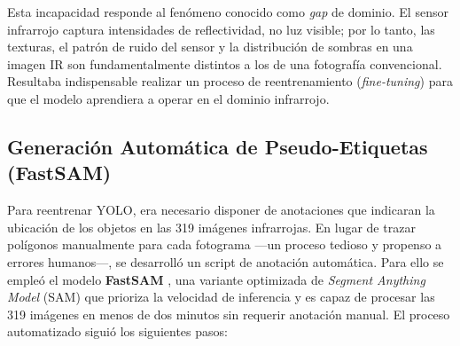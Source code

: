 \documentclass[12pt, a4, twoside, openany]{report}
\begin{document}
Esta incapacidad responde al fenómeno conocido como \textit{gap} de dominio. El sensor infrarrojo captura intensidades de reflectividad, no luz visible; por lo tanto, las texturas, el patrón de ruido del sensor y la distribución de sombras en una imagen IR son fundamentalmente distintos a los de una fotografía convencional. Resultaba indispensable realizar un proceso de reentrenamiento (\textit{fine-tuning}) para que el modelo aprendiera a operar en el dominio infrarrojo.

\subsection{Generación Automática de Pseudo-Etiquetas (FastSAM)}

Para reentrenar YOLO, era necesario disponer de anotaciones que indicaran la ubicación de los objetos en las 319 imágenes infrarrojas. En lugar de trazar polígonos manualmente para cada fotograma ---un proceso tedioso y propenso a errores humanos---, se desarrolló un script de anotación automática. Para ello se empleó el modelo \textbf{FastSAM} \cite{zhao2023fastsam}, una variante optimizada de \textit{Segment Anything Model} (SAM) que prioriza la velocidad de inferencia y es capaz de procesar las 319 imágenes en menos de dos minutos sin requerir anotación manual. El proceso automatizado siguió los siguientes pasos:
\end{document}

